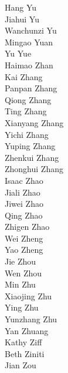 Hang Yu\\
Jiahui Yu\\
Wanchunzi Yu\\
Mingao Yuan\\
Yu Yue\\
Haimao Zhan\\
Kai Zhang\\
Panpan Zhang\\
Qiong Zhang\\
Ting Zhang\\
Xianyang Zhang\\
Yichi Zhang\\
Yuping Zhang\\
Zhenkui Zhang\\
Zhonghui Zhang\\
Isaac Zhao\\
Jiali Zhao\\
Jiwei Zhao\\
Qing Zhao\\
Zhigen Zhao\\
Wei Zheng\\
Yao Zheng\\
Jie Zhou\\
Wen Zhou\\
Min Zhu\\
Xiaojing Zhu\\
Ying Zhu\\
Yunzhang Zhu\\
Yan Zhuang\\
Kathy Ziff\\
Beth Ziniti\\
Jian Zou\\
